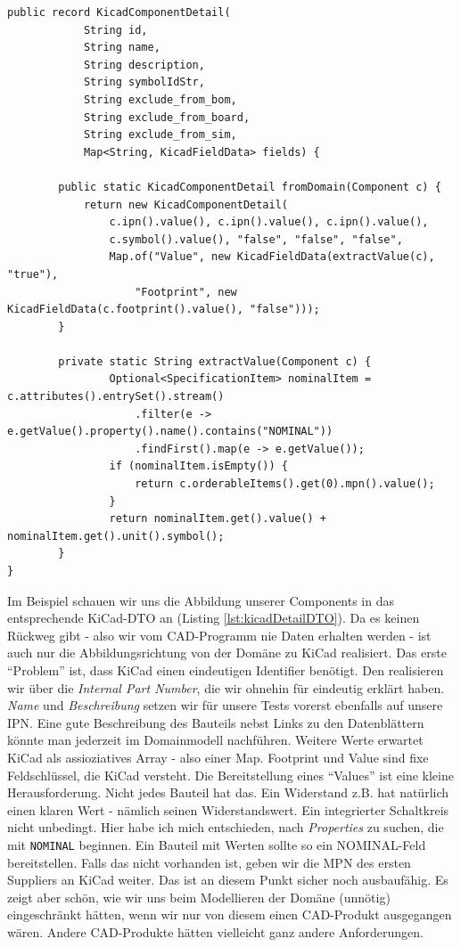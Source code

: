 \begin{listing}[H]
\begin{verbatim}
public record KicadComponentDetail(
            String id,
            String name,
            String description,
            String symbolIdStr,
            String exclude_from_bom,
            String exclude_from_board,
            String exclude_from_sim,
            Map<String, KicadFieldData> fields) {

        public static KicadComponentDetail fromDomain(Component c) {
            return new KicadComponentDetail(
                c.ipn().value(), c.ipn().value(), c.ipn().value(),
                c.symbol().value(), "false", "false", "false",
                Map.of("Value", new KicadFieldData(extractValue(c), "true"),
                    "Footprint", new KicadFieldData(c.footprint().value(), "false")));
        }
        
        private static String extractValue(Component c) {
                Optional<SpecificationItem> nominalItem = c.attributes().entrySet().stream()
                    .filter(e -> e.getValue().property().name().contains("NOMINAL"))
                    .findFirst().map(e -> e.getValue());
                if (nominalItem.isEmpty()) {
                    return c.orderableItems().get(0).mpn().value();
                }
                return nominalItem.get().value() + nominalItem.get().unit().symbol();
        }
}
\end{verbatim}
\caption{KiCad Adapter (KicadComponentDetail - DTO)}
\label{lst:kicadDetailDTO}
\end{listing}
Im Beispiel schauen wir uns die Abbildung unserer Components in das 
entsprechende KiCad-DTO an (Listing \ref{lst:kicadDetailDTO}).
Da es keinen Rückweg gibt - also wir vom CAD-Programm nie Daten erhalten werden -
ist auch nur die Abbildungsrichtung von der Domäne zu KiCad realisiert. Das
erste ``Problem'' ist, dass KiCad einen eindeutigen Identifier benötigt.
Den realisieren wir über die \textit{Internal Part Number}, die wir ohnehin
für eindeutig erklärt haben. \textit{Name} und \textit{Beschreibung} setzen wir
für unsere Tests vorerst ebenfalls auf unsere IPN. Eine gute Beschreibung des
Bauteils nebst Links zu den Datenblättern könnte man jederzeit im Domainmodell
nachführen. Weitere Werte erwartet KiCad als assioziatives Array - also einer
Map. Footprint und Value sind fixe Feldschlüssel, die KiCad versteht. Die
Bereitstellung eines ``Values'' ist eine kleine Herausforderung. Nicht jedes
Bauteil hat das. Ein Widerstand z.B. hat natürlich einen klaren Wert - 
nämlich seinen Widerstandswert. Ein integrierter Schaltkreis nicht unbedingt.
Hier habe ich mich entschieden, nach \textit{Properties} zu suchen, die
mit \texttt{NOMINAL} beginnen. Ein Bauteil mit Werten sollte so ein 
NOMINAL-Feld bereitstellen. Falls das nicht vorhanden ist, geben wir
die MPN des ersten Suppliers an KiCad weiter. Das ist an diesem Punkt
sicher noch ausbaufähig. Es zeigt aber schön, wie wir uns beim Modellieren
der Domäne (unnötig) eingeschränkt hätten, wenn wir nur von diesem einen
CAD-Produkt ausgegangen wären. Andere CAD-Produkte hätten vielleicht ganz
andere Anforderungen.

